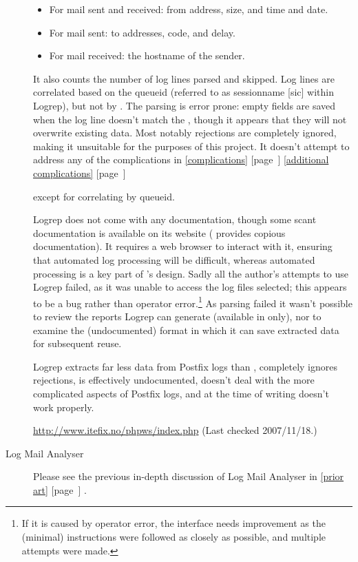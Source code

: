 \documentclass[a4paper,12pt,draft]{article}
\newcommand{\parsername}{\PLP{}}
\newcommand{\parsernames}{\PLP{}'s}
\newcommand{\refwithpage}[1]{%
    \empty{}\ref{#1} [page~\pageref{#1}]%
}
\newcommand{\sectionref}[1]{%
    \textsection{}\refwithpage{#1}%
}
\begin{document}
\begin{description}
\begin{itemize}
            \item For mail sent and received: from address, size, and time
                and date.

            \item For mail sent: to addresses, \SMTP{} code, and delay.

            \item For mail received: the hostname of the sender.

        \end{itemize}

        It also counts the number of log lines parsed and skipped.  Log
        lines are correlated based on the queueid (referred to as
        sessionname [sic] within Logrep), but not by \pid{}.  The parsing
        is error prone: empty fields are saved when the log line doesn't
        match the \regex{}, though it appears that they will not overwrite
        existing data.  Most notably rejections are completely ignored,
        making it unsuitable for the purposes of this project.  It doesn't
        attempt to address any of the complications in
        \sectionref{complications} \sectionref{additional complications}
        except for correlating by queueid.

        Logrep does not come with any documentation, though some scant
        documentation is available on its website (\parsername{} provides
        copious documentation).  It requires a web browser to interact with
        it, ensuring that automated log processing will be difficult,
        whereas automated processing is a key part of \parsernames{}
        design.  Sadly all the author's attempts to use Logrep failed, as
        it was unable to access the log files selected; this appears to be
        a bug rather than operator error.\footnote{If it is caused by
        operator error, the interface needs improvement as the (minimal)
        instructions were followed as closely as possible, and multiple
        attempts were made.}  As parsing failed it wasn't possible to
        review the reports Logrep can generate (available in \HTML{} only),
        nor to examine the (undocumented) format in which it can save
        extracted data for subsequent reuse.

        Logrep extracts far less data from Postfix logs than \parsername{},
        completely ignores rejections, is effectively undocumented, doesn't
        deal with the more complicated aspects of Postfix logs, and at the
        time of writing doesn't work properly.

        \url{http://www.itefix.no/phpws/index.php} \newline (Last checked
        2007/11/18.)

    \item [Log Mail Analyser] Please see the previous in-depth discussion
        of Log Mail Analyser in \sectionref{prior art}.

\end{description}
\end{document}
